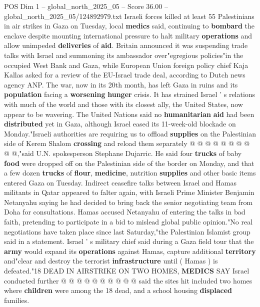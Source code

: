 \begin{textsample}{POS Dim 1 – global\_north\_2025\_05 – Score 36.00 – global\_north\_2025\_05/124892979.txt}  \label{ex:f1_pos_217}
Israeli forces killed at least 55 Palestinians in air strikes in Gaza on Tuesday, local \textbf{medics} said, continuing to \textbf{bombard} the enclave despite mounting international pressure to halt military \textbf{operations} and allow unimpeded \textbf{deliveries} of \textbf{aid}.
Britain announced it was suspending trade talks with Israel and summoning its ambassador over"egregious policies"in the occupied West Bank and Gaza, while European Union foreign policy chief Kaja Kallas asked for a review of the EU-Israel trade deal, according to Dutch news agency ANP.
The war, now in its 20th month, has left Gaza in ruins and its \textbf{population} facing a \textbf{worsening} \textbf{hunger} crisis.
It has strained Israel ' s relations with much of the world and those with its closest ally, the United States, now appear to be wavering.
The United Nations said no \textbf{humanitarian} \textbf{aid} had been \textbf{distributed} yet in Gaza, although Israel eased its 11-week-old blockade on Monday."Israeli authorities are requiring us to offload \textbf{supplies} on the Palestinian side of Kerem Shalom \textbf{crossing} and reload them separately @ @ @ @ @ @ @ @ @ @,"said U.N. spokesperson Stephane Dujarric.
He said four \textbf{trucks} of baby \textbf{food} were dropped off on the Palestinian side of the border on Monday, and that a few dozen \textbf{trucks} of \textbf{flour}, \textbf{medicine}, nutrition \textbf{supplies} and other basic items entered Gaza on Tuesday.
Indirect ceasefire talks between Israel and Hamas militants in Qatar appeared to falter again, with Israeli Prime Minister Benjamin Netanyahu saying he had decided to bring back the senior negotiating team from Doha for consultations.
Hamas accused Netanyahu of entering the talks in bad faith, pretending to participate in a bid to mislead global public opinion."No real negotiations have taken place since last Saturday,"the Palestinian Islamist group said in a statement.
Israel ' s military chief said during a Gaza field tour that the \textbf{army} would expand its \textbf{operations} against Hamas, capture additional \textbf{territory} and"clear and destroy the terrorist \textbf{infrastructure} until ( Hamas ) is defeated."18 DEAD IN AIRSTRIKE ON TWO HOMES, \textbf{MEDICS} SAY Israel conducted further @ @ @ @ @ @ @ @ @ @ said the sites hit included two homes where \textbf{children} were among the 18 dead, and a school housing \textbf{displaced} families.

\end{textsample}
